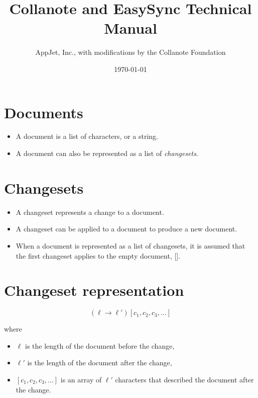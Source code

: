 \documentclass{article}
\begin{document}
\title{Collanote and EasySync Technical Manual}
\author{AppJet, Inc., with modifications by the Collanote Foundation}
\date{\today}

\maketitle

\tableofcontents

\section{Documents}
\begin{itemize}
\item A document is a list of characters, or a string.
\item A document can also be represented as a list of \emph{changesets}.
\end{itemize}

\section{Changesets}

\begin{itemize}
\item A changeset represents a change to a document.
\item A changeset can be applied to a document to produce a new document.
\item When a document is represented as a list of changesets, it is assumed that the first changeset applies to the empty document, [].
\end{itemize}


\section{Changeset representation} \label{representation}

$$(\ell \rightarrow \ell')[c_1,c_2,c_3,...]$$

where

\begin{itemize}
\item[] $\ell$ is the length of the document before the change,
\item[] $\ell'$ is the length of the document after the change,
\item[] $[c_1,c_2,c_3,...]$ is an array of $\ell'$ characters that described the document after the change.
\end{itemize}
\end{document}
